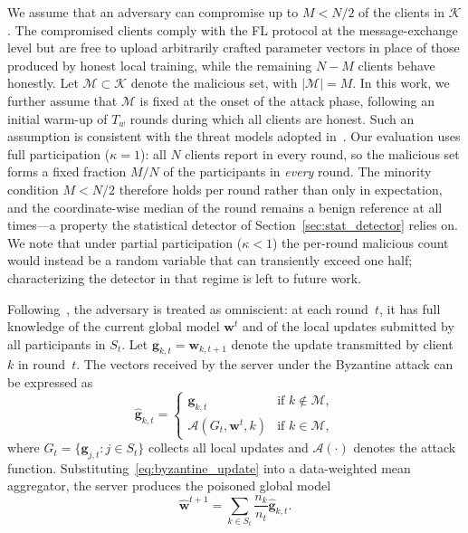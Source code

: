 \documentclass[journal]{IEEEtran}
\begin{document}
We assume that an adversary can compromise up to $M < N/2$ of the clients in $\mathcal{K}$. The compromised clients comply with the FL protocol at the message-exchange level but are free to upload arbitrarily crafted parameter vectors in place of those produced by honest local training, while the remaining $N - M$ clients behave honestly. Let $\mathcal{M} \subset \mathcal{K}$ denote the malicious set, with $|\mathcal{M}| = M$. In this work, we further assume that $\mathcal{M}$ is fixed at the onset of the attack phase, following an initial warm-up of $T_w$ rounds during which all clients are honest. Such an assumption is consistent with the threat models adopted in~\cite{baruch2019little, shejwalkar2021manipulating}. Our evaluation uses full participation ($\kappa=1$): all $N$ clients report in every round, so the malicious set forms a fixed fraction $M/N$ of the participants in \emph{every} round. The minority condition $M<N/2$ therefore holds per round rather than only in expectation, and the coordinate-wise median of the round remains a benign reference at all times---a property the statistical detector of Section~\ref{sec:stat_detector} relies on. We note that under partial participation ($\kappa<1$) the per-round malicious count would instead be a random variable that can transiently exceed one half; characterizing the detector in that regime is left to future work.

Following~\cite{shejwalkar2021manipulating, baruch2019little}, the adversary is treated as omniscient: at each round~$t$, it has full knowledge of the current global model $\mathbf{w}^t$ and of the local updates submitted by all participants in $S_t$. Let $\mathbf{g}_{k,t} = \mathbf{w}_{k,t+1}$ denote the update transmitted by client~$k$ in round~$t$. The vectors received by the server under the Byzantine attack can be expressed as
\begin{equation}
\hat{\mathbf{g}}_{k,t} =
\begin{cases}
\mathbf{g}_{k,t} & \text{if } k \notin \mathcal{M}, \\
\mathcal{A}(G_t, \mathbf{w}^t, k) & \text{if } k \in \mathcal{M},
\end{cases}
\label{eq:byzantine_update}
\end{equation}
where $G_t = \{\mathbf{g}_{j,t} : j \in S_t\}$ collects all local updates and $\mathcal{A}(\cdot)$ denotes the attack function. Substituting~\eqref{eq:byzantine_update} into a data-weighted mean aggregator, the server produces the poisoned global model
\begin{equation}
\hat{\mathbf{w}}^{t+1} = \sum_{k \in S_t} \frac{n_k}{n_t} \hat{\mathbf{g}}_{k,t}.
\label{eq:poisoned_agg}
\end{equation}
\end{document}
